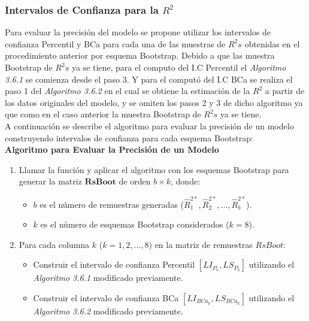 \subsubsection{Intervalos de Confianza para la $R^{2}$}

Para evaluar la precisión del modelo se propone utilizar los intervalos de confianza Percentil y BCa para cada una de las muestras de $R^{2}s$ obtenidas en el procedimiento anterior por esquema Bootstrap. Debido a que las muestra Bootstrap de $R^{2}s$ ya se tiene, para el computo del I.C Percentil el \textit{Algoritmo 3.6.1} se comienza desde el paso 3. Y para el computó del I.C BCa se realiza el paso 1 del \textit{Algoritmo 3.6.2} en el cual se obtiene la estimación de la $R^{2}$ a partir de los datos originales del modelo, y se omiten los pasos 2 y 3 de dicho algoritmo ya que como en el caso anterior la muestra Bootstrap de $R^{2}s$ ya se tiene.\\



A continuación se describe el algoritmo para evaluar la precisión de un modelo construyendo intervalos de confianza para cada esquema Bootstrap:\\


\textbf{Algoritmo para Evaluar la Precisión de un Modelo}

\begin{enumerate}
	
	\item Llamar la función y aplicar el algoritmo con los esquemas Bootstrap para generar la matriz \( \mathbf{RsBoot} \) de orden \( b \times k \), donde:
	\begin{itemize}
		\item \( b \) es el número de remuestras generadas (\( \hat{R}^{2*}_{1}, \hat{R}^{2*}_{2}, \dots, \hat{R}^{2*}_{b} \)).
		\item \( k \) es el número de esquemas Bootstrap considerados (\( k = 8 \)).
	\end{itemize}
	
	\item Para cada columna \( k \) (\( k = 1, 2, \dots, 8 \)) en la matriz de remuestras \( RsBoot \):
	\begin{itemize}
		\item Construir el intervalo de confianza Percentil \( [LI_{P_k}, LS_{P_k}] \) utilizando el \textit{Algoritmo 3.6.1} modificado previamente.
		\item Construir el intervalo de confianza BCa \( [LI_{BCa_k}, LS_{BCa_k}] \) utilizando el \textit{Algoritmo 3.6.2} modificado previamente.
	\end{itemize}
\end{enumerate}





